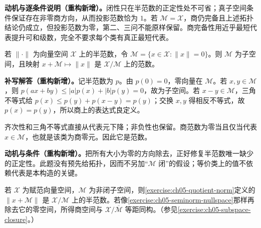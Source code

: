 \documentclass[../../main.tex]{subfiles}
\begin{document}
\begin{remark}
\textbf{动机与逐条件说明（重构新增）。}闭性只在半范数的正定性处不可省；真子空间条件保证存在非零商方向，从而投影范数恰为 $1$。若 $\mathcal M=\mathcal X$，商仍完备且上述拓扑结论仍成立，但投影范数为零，第二、三问不能原样保留。商完备性用近乎最短代表提升可和级数，完全不要求每个类有真正最短代表。
\end{remark}
\begin{exercise}\label{exercise:ch05-seminorm-nullspace}
若 $\|\cdot\|$ 为向量空间 $\mathcal X$ 上的半范数，令 $\mathcal M=\{x\in\mathcal X:\|x\|=0\}$。则 $\mathcal M$ 为子空间，且映射 $x+\mathcal M\mapsto\|x\|$ 是 $\mathcal X/\mathcal M$ 上的范数。
\end{exercise}
\begin{solution}
\textbf{补写解答（重构新增）。}记半范数为 $p$。由 $p(0)=0$，零向量在 $\mathcal M$。若 $x,y\in\mathcal M$，则 $p(ax+by)\le|a|p(x)+|b|p(y)=0$，故为子空间。若 $x-y\in\mathcal M$，三角不等式给 $p(x)\le p(y)+p(x-y)=p(y)$；交换 $x,y$ 得相反不等式，故 $p(x)=p(y)$，所以商上的表达式良定义。

齐次性和三角不等式直接从代表元下降；非负性也保留。商范数为零当且仅当代表 $x\in\mathcal M$，也就是该类为商零元。因此它是范数。
\end{solution}
\begin{remark}
\textbf{动机与条件（重构新增）。}把所有大小为零的方向除去，正好修复半范数唯一缺少的正定性。此题没有预先给拓扑，因而不另加“$\mathcal M$ 闭”的假设；等价类上的值不依赖代表是本构造的关键。
\end{remark}
\begin{exercise}\label{exercise:ch05-nonclosed-quotient}
若 $\mathcal X$ 为赋范向量空间，$\mathcal M$ 为非闭子空间，则\cref{exercise:ch05-quotient-norm}定义的 $\|x+\mathcal M\|$ 是 $\mathcal X/\mathcal M$ 上的半范数。若像\cref{exercise:ch05-seminorm-nullspace}那样再除去它的零空间，所得商空间与 $\mathcal X/\overline{\mathcal M}$ 等距同构。（参见\cref{exercise:ch05-subspace-closure}。）
\end{exercise}
\end{document}

